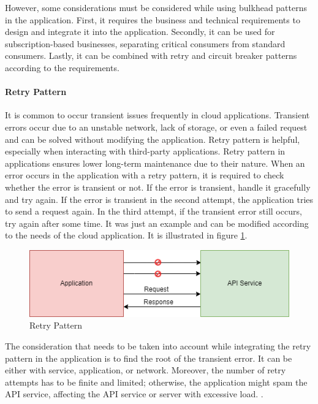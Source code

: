 \documentclass[12pt,a4paper]{article}
\begin{document}
However, some considerations must be considered while using bulkhead patterns in the application. First, it requires the business and technical requirements to design and integrate it into the application. Secondly, it can be used for subscription-based businesses, separating critical consumers from standard consumers. Lastly, it can be combined with retry and circuit breaker patterns according to the requirements. \cite{r25}

\paragraph{Retry Pattern}

It is common to occur transient issues frequently in cloud applications. Transient errors occur due to an unstable network, lack of storage, or even a failed request and can be solved without modifying the application. Retry pattern is helpful, especially when interacting with third-party applications. Retry pattern in applications ensures lower long-term maintenance due to their nature. \cite{r26} When an error occurs in the application with a retry pattern, it is required to check whether the error is transient or not. If the error is transient, handle it gracefully and try again. If the error is transient in the second attempt, the application tries to send a request again. In the third attempt, if the transient error still occurs, try again after some time. It was just an example and can be modified according to the needs of the cloud application. It is illustrated in figure \ref{retry}. \cite{r25}

\begin{figure}[H]
\centering
\includegraphics[scale=0.75]{retry_pattern.PNG}
\caption{Retry Pattern \cite{r26}}
\label{retry}
\end{figure}

The consideration that needs to be taken into account while integrating the retry pattern in the application is to find the root of the transient error. It can be either with service, application, or network. Moreover, the number of retry attempts has to be finite and limited; otherwise, the application might spam the API service, affecting the API service or server with excessive load. \cite{r25}.
\end{document}
